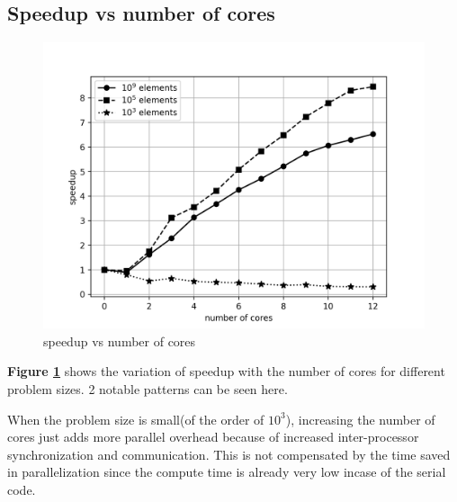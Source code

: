 \documentclass[12,a4paper]{article}
\begin{document}
    \subsection{Speedup vs number of cores}
    \begin{figure}[H]
        \centering
        \includegraphics[width=\textwidth]{speedup_cores.png}
        \caption{speedup vs number of cores}
        \label{fig:q1p4}
    \end{figure}
    \textbf{Figure \ref{fig:q1p4}} shows the variation of speedup with the number of cores for different problem sizes. 2 notable patterns can be seen here.
    
    When the problem size is small(of the order of $10^3$), increasing the number of cores just adds more parallel overhead because of increased inter-processor synchronization and communication. This is not compensated by the time saved in parallelization since the compute time is already very low incase of the serial code.
    
\end{document}
